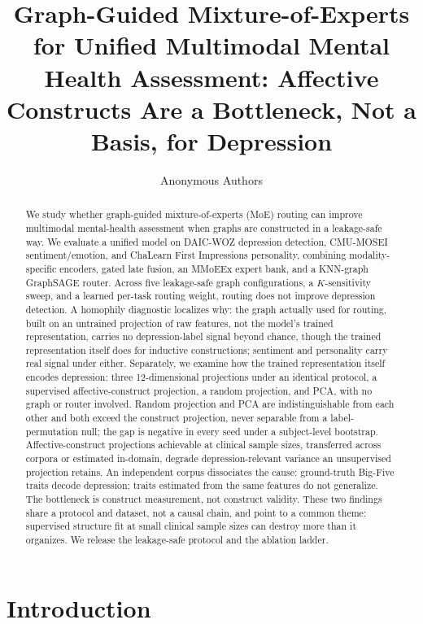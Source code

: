 \documentclass[letterpaper]{article}
\title{Graph-Guided Mixture-of-Experts for Unified Multimodal Mental Health Assessment: Affective Constructs Are a Bottleneck, Not a Basis, for Depression}
\author{
Anonymous Authors
}
\begin{document}
\maketitle

\begin{abstract}
    We study whether graph-guided mixture-of-experts (MoE) routing can improve multimodal mental-health assessment when graphs are constructed in a leakage-safe way. We evaluate a unified model on DAIC-WOZ depression detection, CMU-MOSEI sentiment/emotion, and ChaLearn First Impressions personality, combining modality-specific encoders, gated late fusion, an MMoEEx expert bank, and a KNN-graph GraphSAGE router. Across five leakage-safe graph configurations, a $K$-sensitivity sweep, and a learned per-task routing weight, routing does not improve depression detection. A homophily diagnostic localizes why: the graph actually used for routing, built on an untrained projection of raw features, not the model's trained representation, carries no depression-label signal beyond chance, though the trained representation itself does for inductive constructions; sentiment and personality carry real signal under either. Separately, we examine how the trained representation itself encodes depression: three 12-dimensional projections under an identical protocol, a supervised affective-construct projection, a random projection, and PCA, with no graph or router involved. Random projection and PCA are indistinguishable from each other and both exceed the construct projection, never separable from a label-permutation null; the gap is negative in every seed under a subject-level bootstrap. Affective-construct projections achievable at clinical sample sizes, transferred across corpora or estimated in-domain, degrade depression-relevant variance an unsupervised projection retains. An independent corpus dissociates the cause: ground-truth Big-Five traits decode depression; traits estimated from the same features do not generalize. The bottleneck is construct measurement, not construct validity. These two findings share a protocol and dataset, not a causal chain, and point to a common theme: supervised structure fit at small clinical sample sizes can destroy more than it organizes. We release the leakage-safe protocol and the ablation ladder.
\end{abstract}

\section{Introduction}
\end{document}

